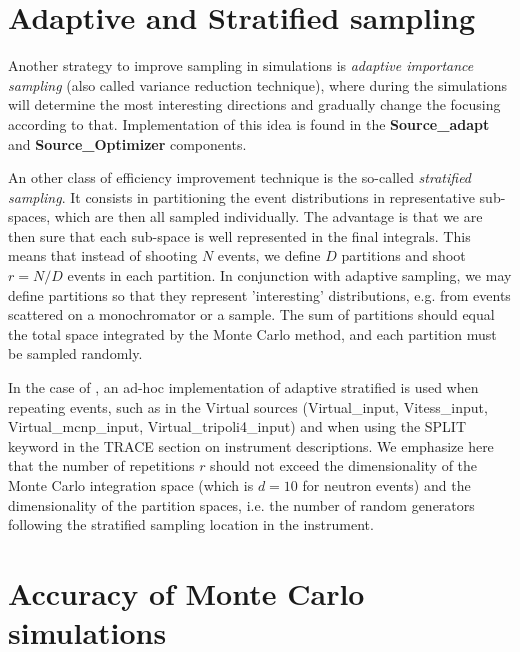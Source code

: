 \section{Adaptive and Stratified sampling}

Another strategy to improve sampling in simulations
is \emph{adaptive importance sampling} (also called variance reduction technique), %
where \MCS during the simulations will determine
the most interesting directions and gradually change
the focusing according to that.
Implementation of this idea is
found in the \textbf{Source\_adapt} and \textbf{Source\_Optimizer} components.

An other class of efficiency improvement technique is the so-called \emph{stratified sampling}. It consists in partitioning the event distributions in representative sub-spaces, which are then all sampled individually. The advantage is that we are then sure that each sub-space is well represented in the final integrals. This means that instead of shooting $N$ events, we define $D$ partitions and shoot $r=N/D$ events in each partition. In conjunction with adaptive sampling, we may define partitions so that they represent 'interesting' distributions, e.g. from events scattered on a monochromator or a sample. The sum of partitions should equal the total space integrated by the Monte Carlo method, and each partition must be sampled randomly.

In the case of \MCS, an ad-hoc implementation of adaptive stratified is used when repeating events, such as in the Virtual sources (Virtual\_input, Vitess\_input, Virtual\_mcnp\_input, Virtual\_tripoli4\_input) and when using the SPLIT keyword in the TRACE section on instrument descriptions. We emphasize here that the number of repetitions $r$ should not exceed the dimensionality of the Monte Carlo integration space (which is $d=10$ for neutron events) and the dimensionality of the partition spaces, i.e. the number of random generators following the stratified sampling location in the instrument.

\section{Accuracy of Monte Carlo simulations}

